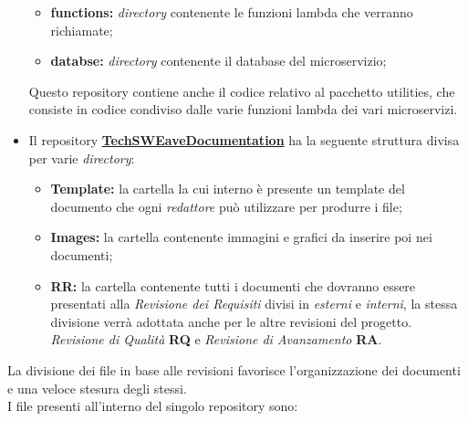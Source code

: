 \begin{itemize}
          \begin{itemize}
              \item \textbf{functions:} \textit{directory} contenente le funzioni lambda che verranno richiamate;
              \item \textbf{databse:} \textit{directory} contenente il database del microservizio;
          \end{itemize}
          Questo repository contiene anche il codice relativo al pacchetto utilities, che consiste in codice condiviso dalle varie funzioni lambda dei vari microservizi.
    \item Il repository  \textbf{\href{https://github.com/techsweave/TechSWEaveDocumentation.git}{TechSWEaveDocumentation}} ha la seguente struttura divisa per varie \textit{directory}:
          \begin{itemize}
              \item \textbf{Template:} la cartella la cui interno è presente un template del documento che ogni \textit{redattore} può utilizzare per produrre i file;
              \item \textbf{Images:} la cartella contenente immagini e grafici da inserire poi nei documenti;
              \item \textbf{RR:} la cartella contenente tutti i documenti che dovranno essere presentati alla \textit{Revisione dei Requisiti} divisi in \textit{esterni} e \textit{interni}, la stessa divisione verrà adottata anche per le altre revisioni del progetto. \textit{Revisione di Qualità} \textbf{RQ} e \textit{Revisione di Avanzamento} \textbf{RA}.
          \end{itemize}
\end{itemize}
La divisione dei file in base alle revisioni favorisce l'organizzazione dei documenti e una veloce stesura degli stessi.\\
I file presenti all'interno del singolo repository sono:
